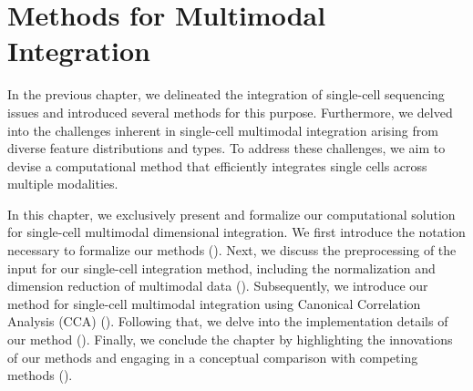 %
\chapter{Methods for Multimodal Integration}
\label{chapter:methods_inte}
\graphicspath{{chapter4/figs}}

In the previous chapter, we delineated the integration of single-cell sequencing issues and introduced several methods for this purpose. Furthermore, we delved into the challenges inherent in single-cell multimodal integration arising from diverse feature distributions and types. To address these challenges, we aim to devise a computational method that efficiently integrates single cells across multiple modalities.


In this chapter, we exclusively present and formalize our computational solution for single-cell multimodal dimensional integration. We first introduce the notation necessary to formalize our methods (). Next, we discuss the preprocessing of the input for our single-cell integration method, including the normalization and dimension reduction of multimodal data (). Subsequently, we introduce our method for single-cell multimodal integration using Canonical Correlation Analysis (CCA) (). Following that, we delve into the implementation details of our method (). Finally, we conclude the chapter by highlighting the innovations of our methods and engaging in a conceptual comparison with competing methods ().


